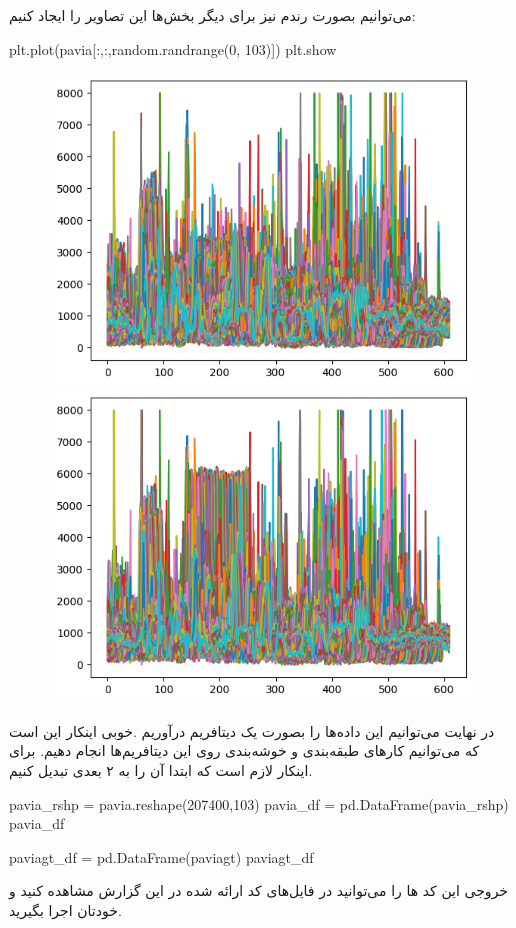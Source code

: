 \documentclass[a4paper, 12pt]{article}
\begin{document}
می‌توانیم بصورت رندم نیز برای دیگر بخش‌ها این تصاویر را ایجاد کنیم:
\begin{latin}
	\begin{python}
plt.plot(pavia[:,:,random.randrange(0, 103)])
plt.show
	\end{python}
\end{latin}
\begin{center}
	\begin{figure}[H]
		\includegraphics[scale=0.6]{fig10.png}
		\includegraphics[scale=0.6]{fig11.png}
	\end{figure}
\end{center}
در نهایت می‌توانیم این داده‌ها را بصورت یک دیتافریم درآوریم .خوبی اینکار این است که می‌توانیم کار‌های طبقه‌بندی و خوشه‌بندی روی این دیتافریم‌ها انجام دهیم. برای اینکار لازم است که ابتدا آن را به ۲ بعدی تبدیل کنیم. 
\begin{latin}
	\begin{python}
pavia_rshp = pavia.reshape(207400,103)
pavia_df = pd.DataFrame(pavia_rshp)
pavia_df
	\end{python}
\end{latin}
\begin{latin}
	\begin{python}
paviagt_df = pd.DataFrame(paviagt)
paviagt_df
	\end{python}
\end{latin}
خروجی این کد ها را می‌توانید در فایل‌های کد ارائه شده در این گزارش مشاهده کنید و خودتان اجرا بگیرید.
\end{document}
